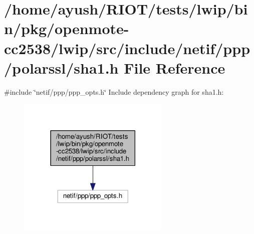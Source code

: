 \hypertarget{openmote-cc2538_2lwip_2src_2include_2netif_2ppp_2polarssl_2sha1_8h}{}\section{/home/ayush/\+R\+I\+O\+T/tests/lwip/bin/pkg/openmote-\/cc2538/lwip/src/include/netif/ppp/polarssl/sha1.h File Reference}
\label{openmote-cc2538_2lwip_2src_2include_2netif_2ppp_2polarssl_2sha1_8h}
{\ttfamily \#include \char`\"{}netif/ppp/ppp\+\_\+opts.\+h\char`\"{}}\newline
Include dependency graph for sha1.\+h\+:
\nopagebreak
\begin{figure}[H]
\begin{center}
\leavevmode
\includegraphics[width=206pt]{openmote-cc2538_2lwip_2src_2include_2netif_2ppp_2polarssl_2sha1_8h__incl}
\end{center}
\end{figure}
